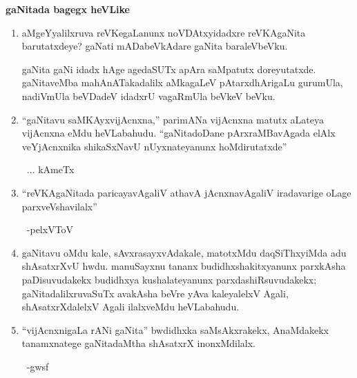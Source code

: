 \begin{center}
{\bf gaNitada bagegx heVLike}
\end{center}

\begin{enumerate}[\rm 1]
\item aMgeYyalilxruva reVKegaLanunx noVDAtxyidadxre reVKAgaNita barutatxdeye? gaNati mADabeVkAdare gaNita baraleVbeVku.

gaNita gaNi idadx hAge agedaSUTx apAra saMpatutx doreyutatxde. gaNitaveMba mahAnATakadalilx aMkagaLeV pAtarxdhArigaLu gurumUla, nadiVmUla beVDadeV idadxrU vagaRmUla beVkeV beVku.

\item  ``gaNitavu saMKAyxvijAcnxna,'' parimANa vijAcnxna matutx aLateya vijAcnxna eMdu heVLabahudu. ``gaNitadoDane pArxraMBavAgada elAlx veYjAcnxnika shikaSxNavU nUyxnateyanunx hoMdirutatxde''

~\hfill $\ldots$  kAmeTx

\item ``reVKAgaNitada paricayavAgaliV athavA jAcnxnavAgaliV iradavarige oLage parxveVshavilalx''

~\hfill -pelxVToV

\item gaNitavu oMdu kale, sAvxrasayxvAdakale, matotxMdu daqSiThxyiMda adu shAsatxrXvU hwdu. manuSayxnu tananx budidhxshakitxyanunx parxkAsha paDisuvudakekx budidhxya kushalate\-yanunx parxdashiRsuvudakekx; gaNitadalilxruvaSuTx avakAsha beVre yAva kaleyalelxV Agali, shAsatxrXdalelxV Agali ilalxveMdu heVLabahudu.

\item ``vijAcnxnigaLa rANi gaNita'' bwdidhxka saMsAkxrakekx, AnaMdakekx tanamxnatege gaNitadaMtha shAsatxrX inonxMdilalx.

~\hfill -gwsf

\end{enumerate}


